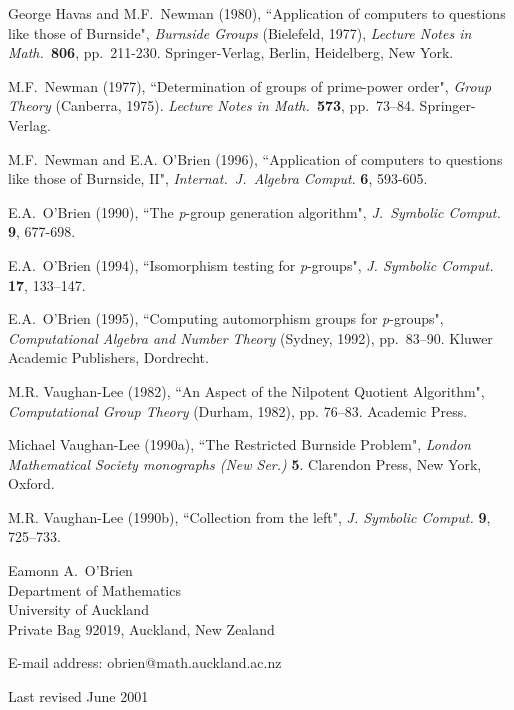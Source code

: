 \documentclass[12pt]{article}
\begin{document}
\begin{description}
\item George Havas and M.F.\ Newman (1980), ``Application of computers to
questions like those of Burnside", {\it Burnside Groups} (Bielefeld, 1977),
{\it Lecture Notes in Math.\ }{\bf 806}, pp.\ 211-230.
Springer-Verlag, Berlin, Heidelberg, New York.

\item M.F.\ Newman (1977), ``Determination of groups of prime-power order", 
{\it Group Theory} (Canberra, 1975). {\it Lecture Notes in Math.\ }{\bf 573},
pp.\ 73--84. 
Springer-Verlag.

\item M.F.\ Newman and E.A. O'Brien (1996),
``Application of computers to questions like those of Burnside, {II}",
{\it Internat.\ J.\ Algebra Comput}. {\bf 6}, 593-605.
 
\item E.A.\ O'Brien (1990), ``The {\it p}-group generation
algorithm", {\it J.\ Symbolic Comput.} {\bf 9}, 677-698.

\item E.A.\ O'Brien (1994), ``Isomorphism testing
for \mbox{{\it p}-groups}", {\it J. Symbolic Comput.} {\bf 17},
133--147.

\item E.A.\ O'Brien (1995), ``Computing automorphism groups for
{\it p}-groups",  {\it Computational Algebra and Number Theory}
(Sydney, 1992), pp.\ 83--90. Kluwer Academic Publishers, Dordrecht.

\item M.R. Vaughan-Lee (1982), ``An Aspect of the Nilpotent 
Quotient Algorithm", {\it Computational Group Theory}
(Durham, 1982), pp. 76--83. Academic Press.

\item Michael Vaughan-Lee (1990a), ``The Restricted Burnside Problem",
{\it London Mathematical Society monographs (New Ser.)} {\bf 5}.
Clarendon Press, New York, Oxford.

\item M.R. Vaughan-Lee (1990b), ``Collection from the left", 
{\it J. Symbolic Comput.} {\bf 9}, 725--733.

\end{description}

\noindent 
Eamonn A.\ O'Brien \\
Department of Mathematics \\
University of Auckland  \\
Private Bag 92019, Auckland, New Zealand

\vspace*{0.25cm}
\noindent 
E-mail address: obrien@math.auckland.ac.nz

\vspace*{0.35cm}
\noindent 
Last revised June 2001
\end{document}
